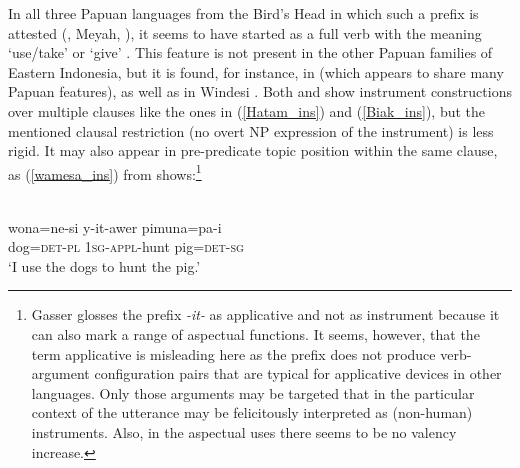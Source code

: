 In all three Papuan languages from the Bird's Head in which such a prefix is attested (, Meyah, ), it seems to have started as a full verb with the meaning `use/take' or `give' \citep[194]{reesink2005west}. This feature is not present in the other Papuan families of Eastern Indonesia, but it is found, for instance, in  (which appears to share many Papuan features), as well as in Windesi  \citep[188ff]{gasser2014windesi}. Both  and  show instrument constructions over multiple clauses like the ones in (\ref{Hatam_ins}) and (\ref{Biak_ins}), but the mentioned clausal restriction (no overt NP expression of the instrument) is less rigid. It may also appear in pre-predicate topic position within the same clause, as (\ref{wamesa_ins}) from  shows:\footnote{Gasser glosses the prefix \textit{-it-} as applicative and not as instrument because it can also mark a range of aspectual functions. It seems, however, that the term applicative is misleading here as the prefix does not produce verb-argument configuration pairs that are typical for applicative devices in other languages. Only those arguments may be targeted that in the particular context of the utterance may be felicitously interpreted as (non-human) instruments. Also, in the aspectual uses there seems to be no valency increase.}

\ea \label{wamesa_ins} 
\\
\gll wona=ne-si y-it-awer pimuna=pa-i \\
dog=\textsc{det}-\textsc{pl} \textsc{1}\textsc{sg}-\textsc{appl}-hunt pig=\textsc{det}-\textsc{sg} \\
\glft `I use the dogs to hunt the pig.'\\ 
\z

